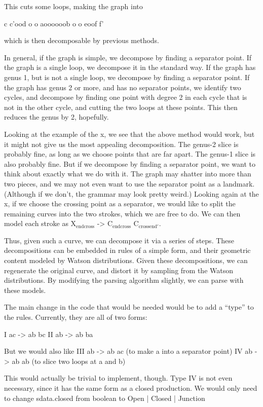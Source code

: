 \documentclass{book}
\begin{document}
This cuts some loops, making the graph into

c  c'ood
o      o
aoooooob
o      o
eoof   f'

which is then decomposable by previous methods.

In general, if the graph is simple, we decompose by finding a
separator point. If the graph is a single loop, we decompose it in the
standard way. If the graph has genus 1, but is not a single loop, we
decompose by finding a separator point. If the graph has genus 2 or
more, and has no separator points, we identify two cycles, and
decompose by finding one point with degree 2 in each cycle that is not
in the other cycle, and cutting the two loops at these points. This
then reduces the genus by 2, hopefully.

Looking at the example of the x, we see that the above method would
work, but it might not give us the most appealing decomposition. The
genus-2 slice is probably fine, as long as we choose points that are
far apart. The genus-1 slice is also probably fine. But if we
decompose by finding a separator point, we want to think about exactly
what we do with it. The graph may shatter into more than two pieces,
and we may not even want to use the separator point as a
landmark. (Although if we don't, the grammar may look pretty weird.)
Looking again at the x, if we choose the crossing point as a
separator, we would like to split the remaining curves into the two
strokes, which we are free to do. We can then model each stroke as
X$_{\mathrm{end cross}}$ -> C$_{\mathrm{end cross}}$ C$_{\mathrm{cross end'}}$.

Thus, given such a curve, we can decompose it via a series of
steps. These decompositions can be embedded in rules of a simple form,
and their geometric content modeled by Watson distributions. Given
these decompositions, we can regenerate the original curve, and
distort it by sampling from the Watson distributions. By modifying the
parsing algorithm slightly, we can parse with these models.

The main change in the code that would be needed would be to add a
``type'' to the rules. Currently, they are all of two forms:

I   ac -> ab bc
II  ab -> ab ba

But we would also like
III ab -> ab ac   (to make a into a separator point)
IV  ab -> ab ab   (to slice two loops at a and b)

This would actually be trivial to implement, though. Type IV is not
even necessary, since it has the same form as a closed production. We
would only need to change sdata.closed from boolean to Open | Closed |
Junction
\end{document}
